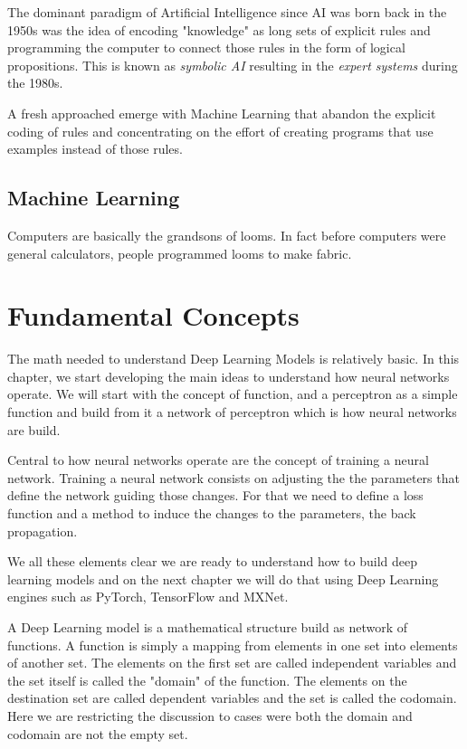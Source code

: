 \documentclass[10pt]{book}
\begin{document}
The dominant paradigm of Artificial Intelligence since AI was born back in the 1950s was the idea of encoding "knowledge" as long sets of explicit rules and programming the computer to connect those rules in the form of logical propositions. This is known as \textit{symbolic AI} resulting in the \textit{expert systems} during the 1980s.

A fresh approached emerge with Machine Learning that abandon the explicit coding of rules and concentrating on the effort of creating programs that use examples instead of those rules.

\section{Machine Learning}

Computers are basically the grandsons of looms. In fact before computers were general calculators, people programmed looms to make fabric. 



\chapter{Fundamental Concepts}

The math needed to understand Deep Learning Models is relatively basic.
In this chapter, we start developing the main ideas to understand how neural networks operate. 
We will start with the concept of function, and a perceptron as a simple function and build from it a network of perceptron which is how neural networks are build. 

Central to how neural networks operate are the concept of training a neural network.
Training a neural network consists on adjusting the the parameters that define the network guiding those changes. 
For that we need to define a loss function and a method to induce the changes to the parameters, the back propagation.

We all these elements clear we are ready to understand how to build deep learning models and on the next chapter we will do that using Deep Learning engines such as PyTorch, TensorFlow and MXNet.

A Deep Learning model is a mathematical structure build as network of functions. 
A function is simply a mapping from elements in one set into elements of another set. 
The elements on the first set are called independent variables and the set itself is called the "domain" of the function.
The elements on the destination set are called dependent variables and the set is called the codomain.
Here we are restricting the discussion to cases were both the domain and codomain are not the empty set.
\end{document}
